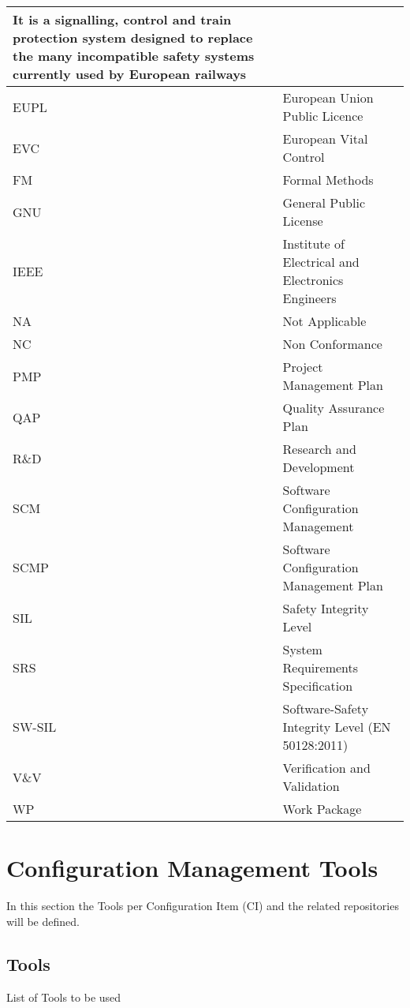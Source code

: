 \documentclass{template/openetcs_article}
\begin{document}
\begin{center}
\begin{longtable}{|m{3cm}m{11cm}|}
It is a signalling, control and train protection system designed to replace the many incompatible safety systems currently used by European railways\\\hline
EUPL &
European Union Public Licence\\\hline
EVC &
European Vital Control\\\hline
FM &
Formal Methods\\\hline
GNU &
General Public License\\\hline
IEEE &
Institute of Electrical and Electronics Engineers\\\hline
NA &
Not Applicable\\\hline
NC &
Non Conformance\\\hline
PMP &
Project Management Plan\\\hline
QAP &
Quality Assurance Plan\\\hline
R\&D &
Research and Development\\\hline
SCM &
Software Configuration Management\\\hline
SCMP &
Software Configuration Management Plan\\\hline
SIL &
Safety Integrity Level\\\hline
SRS &
System Requirements Specification\\\hline
SW-SIL &
Software-Safety Integrity Level (EN 50128:2011)\\\hline
V\&V &
Verification and Validation\\\hline
WP &
Work Package\\\hline
\end{longtable}
\end{center}


\section{Configuration Management Tools}
In this section the Tools per Configuration Item (CI) and the related repositories will be defined. 


\subsection{Tools}
List of Tools to be used
\end{document}
